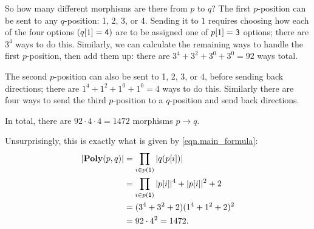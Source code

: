 \documentclass[Book-Poly]{subfiles}
\begin{document}
\begin{example}
So how many different morphisms are there from $p$ to $q$? The first $p$-position can be sent to any $q$-position: 1, 2, 3, or 4. Sending it to $1$ requires choosing how each of the four options $(q[1]=\textsf{4})$ are to be assigned one of $p[1]=\textsf{3}$ options; there are $3^4$ ways to do this. Similarly, we can calculate the remaining ways to handle the first $p$-position, then add them up: there are $3^4+3^2+3^0+3^0=92$ ways total. 

The second $p$-position can also be sent to 1, 2, 3, or 4, before sending back directions; there are $1^4+1^2+1^0+1^0=4$ ways to do this. 
Similarly there are four ways to send the third $p$-position to a $q$-position and send back directions.

In total, there are $92 \cdot 4 \cdot 4=1472$ morphisms $p\to q$.

Unsurprisingly, this is exactly what is given by \eqref{eqn.main_formula}:
\begin{align*}
    |\mathbf{Poly}(p, q)| &= \prod_{i \in p(\textsf{1})} |q(p[i])| \\
    &= \prod_{i \in p(\textsf{1})} |p[i]|^4 + |p[i]|^2 + 2 \\
    &= (3^4 + 3^2 + 2)(1^4 + 1^2 + 2)^2 \\
    &= 92 \cdot 4^2 = 1472.
\end{align*}
\end{example}
\end{document}

